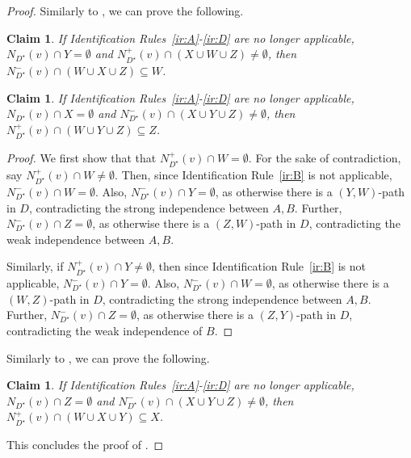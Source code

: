 \documentclass[a4paper,11pt]{article}
\theoremstyle{plain}
\newtheorem{claim}[theorem]{Claim}
\newtheorem{identification rule}{Identification Rule}
\theoremstyle{definition}
\theoremstyle{remark}
\newenvironment{claimproof}{\begin{proof}\renewcommand{\qedsymbol}{\claimqed}}{\end{proof}\renewcommand{\qedsymbol}{\plainqed}}
\let\plainqed\qedsymbol
\newcommand{\claimqed}{$\lrcorner$}
\begin{document}
\begin{proof}
Similarly to , we can prove the following.

\begin{claim}\label{claim:ordered-ir6}
If Identification Rules~\ref{ir:A}-\ref{ir:D} are no longer applicable, $N_{D^{\star}}(v) \cap Y=\emptyset$ and  $N_{D^{\star}}^+(v) \cap (X \cup W \cup Z) \neq \emptyset$, then $N_{D^{\star}}^-(v) \cap (W \cup X \cup Z) \subseteq W$.
\end{claim}

\begin{claim}\label{claim:ordered-ir7}
If Identification Rules~\ref{ir:A}-\ref{ir:D} are no longer applicable, $N_{D^{\star}}(v) \cap X=\emptyset$ and $N_{D^{\star}}^-(v) \cap (X \cup Y \cup Z) \neq \emptyset$, then $N_{D^{\star}}^+(v) \cap ( W \cup Y \cup Z) \subseteq Z$.
\end{claim}

\begin{claimproof}
We first show that that $N_{D^{\star}}^+(v) \cap W = \emptyset$. 
For the sake of contradiction, say $N_{D^{\star}}^+(v) \cap W \neq \emptyset$. 
Then, since Identification Rule~\ref{ir:B} is not applicable, $N_{D^{\star}}^-(v) \cap W = \emptyset$. 
Also, $N_{D^{\star}}^-(v) \cap Y = \emptyset$, as otherwise there is a $(Y,W)$-path in $D$, contradicting the strong independence between $A,B$. 
Further, $N_{D^{\star}}^-(v) \cap Z = \emptyset$, as otherwise there is a $(Z,W)$-path in $D$, contradicting the weak independence between $A,B$.

Similarly, if $N_{D^{\star}}^+(v) \cap Y \neq \emptyset$,
then since Identification Rule~\ref{ir:B} is not applicable, $N_{D^{\star}}^-(v) \cap Y = \emptyset$.  
Also,  $N_{D^{\star}}^-(v) \cap W= \emptyset$, as otherwise there is a $(W,Z)$-path in $D$, contradicting the strong independence between $A,B$. 
Further, 
$N_{D^{\star}}^-(v) \cap Z= \emptyset$, as otherwise there is a $(Z,Y)$-path in $D$, contradicting the weak independence of $B$.
\end{claimproof}

Similarly to , we can prove the following.

\begin{claim}\label{claim:ordered-ir8}
If Identification Rules~\ref{ir:A}-\ref{ir:D} are no longer applicable, $N_{D^{\star}}(v) \cap Z=\emptyset$ and $N_{D^{\star}}^-(v) \cap (X \cup Y \cup Z) \neq \emptyset$, then $N_{D^{\star}}^+(v) \cap ( W \cup X \cup Y) \subseteq X$.
\end{claim}
This concludes the proof of .
\end{proof}
\end{document}
